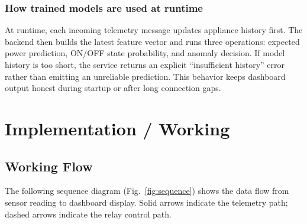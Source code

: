 \documentclass[12pt, a4paper]{article}
\numberwithin{figure}{section}
\numberwithin{table}{section}
\begin{document}
	\subsubsection{How trained models are used at runtime}
	
	At runtime, each incoming telemetry message updates appliance history first. The backend then builds the latest feature vector and runs three operations: expected power prediction, ON/OFF state probability, and anomaly decision. If model history is too short, the service returns an explicit ``insufficient history'' error rather than emitting an unreliable prediction. This behavior keeps dashboard output honest during startup or after long connection gaps.
	
	\newpage
	
	\section{Implementation / Working}\label{sec:implementation}
	
	\subsection{Working Flow}
	
	The following sequence diagram (Fig.~\ref{fig:sequence}) shows the data flow from sensor reading to dashboard display. Solid arrows indicate the telemetry path; dashed arrows indicate the relay control path.
	
\end{document}
